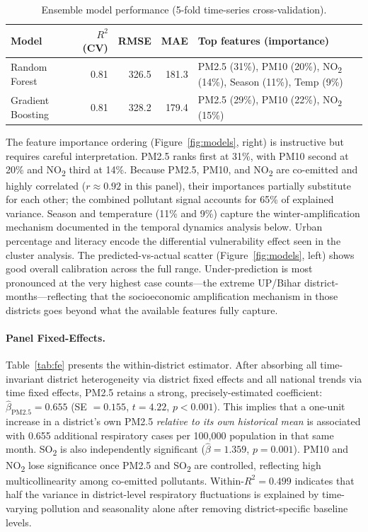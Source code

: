 \documentclass{article}
\begin{document}
\begin{table}[ht]
  \caption{Ensemble model performance (5-fold time-series cross-validation).}
  \label{tab:ml}
  \centering
  \small
  \begin{tabular}{lrrrp{5.5cm}}
    \toprule
    Model & $R^2$ (CV) & RMSE & MAE & Top features (importance) \\
    \midrule
    Random Forest     & 0.81 & 326.5 & 181.3 & PM2.5 (31\%), PM10 (20\%), NO\textsubscript{2} (14\%), Season (11\%), Temp (9\%) \\
    Gradient Boosting & 0.81 & 328.2 & 179.4 & PM2.5 (29\%), PM10 (22\%), NO\textsubscript{2} (15\%)\\
    \bottomrule
  \end{tabular}
\end{table}

The feature importance ordering (Figure~\ref{fig:models}, right) is instructive but
requires careful interpretation. PM2.5 ranks first at 31\%, with PM10 second at 20\%
and NO\textsubscript{2} third at 14\%. Because PM2.5, PM10, and NO\textsubscript{2}
are co-emitted and highly correlated ($r \approx 0.92$ in this panel), their importances
partially substitute for each other; the combined pollutant signal accounts for 65\% of
explained variance. Season and temperature (11\% and 9\%) capture the winter-amplification
mechanism documented in the temporal dynamics analysis below. Urban percentage and literacy encode
the differential vulnerability effect seen in the cluster analysis. The predicted-vs-actual
scatter (Figure~\ref{fig:models}, left) shows good overall calibration across the full
range. Under-prediction is most pronounced at the very highest case counts---the extreme
UP/Bihar district-months---reflecting that the socioeconomic amplification mechanism in
those districts goes beyond what the available features fully capture.

\paragraph{Panel Fixed-Effects.}
Table~\ref{tab:fe} presents the within-district estimator. After absorbing all time-invariant
district heterogeneity via district fixed effects and all national trends via time fixed
effects, PM2.5 retains a strong, precisely-estimated coefficient: $\hat{\beta}_{\text{PM2.5}} = 0.655$
(SE $= 0.155$, $t = 4.22$, $p < 0.001$). This implies that a one-unit increase in a
district's own PM2.5 \emph{relative to its own historical mean} is associated with 0.655
additional respiratory cases per 100,000 population in that same month. SO\textsubscript{2}
is also independently significant ($\hat{\beta} = 1.359$, $p = 0.001$). PM10 and
NO\textsubscript{2} lose significance once PM2.5 and SO\textsubscript{2} are controlled,
reflecting high multicollinearity among co-emitted pollutants. Within-$R^2 = 0.499$
indicates that half the variance in district-level respiratory fluctuations is explained
by time-varying pollution and seasonality alone after removing district-specific baseline
levels.
\end{document}
